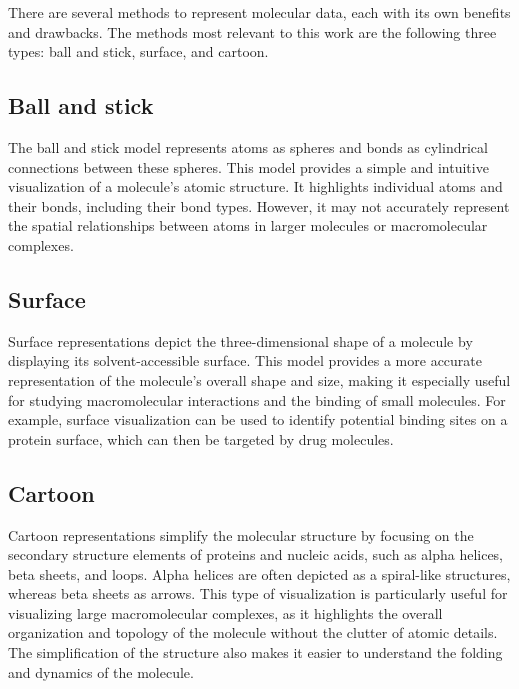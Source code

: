 \documentclass[
  digital,     %
  oneside,     %
  nosansbold,  %
  nocolorbold, %
  lof,         %
  lot,         %
]{fithesis4}
\begin{document}
There are several methods to represent molecular data, each with its own benefits and drawbacks. The methods most relevant to this work are the following three types: ball and stick, surface, and cartoon.

\subsection{Ball and stick}
\label{subsection:ball_and_stick}

The ball and stick model represents atoms as spheres and bonds as cylindrical connections between these spheres. This model provides a simple and intuitive visualization of a molecule's atomic structure. It highlights individual atoms and their bonds, including their bond types. However, it may not accurately represent the spatial relationships between atoms in larger molecules or macromolecular complexes.

\subsection{Surface}
\label{subsection:surface}

Surface representations depict the three-dimensional shape of a molecule by displaying its solvent-accessible surface.
This model provides a more accurate representation of the molecule's overall shape and size, making it especially useful for studying macromolecular interactions and the binding of small molecules.
For example, surface visualization can be used to identify potential binding sites on a protein surface, which can then be targeted by drug molecules.

\subsection{Cartoon}
\label{subsection:cartoon}

Cartoon representations simplify the molecular structure by focusing on the secondary structure elements of proteins and nucleic acids, such as alpha helices, beta sheets, and loops. Alpha helices are often depicted as a spiral-like structures, whereas beta sheets as arrows. This type of visualization is particularly useful for visualizing large macromolecular complexes, as it highlights the overall organization and topology of the molecule without the clutter of atomic details. The simplification of the structure also makes it easier to understand the folding and dynamics of the molecule.
\end{document}

